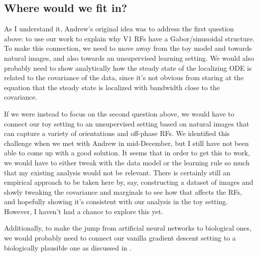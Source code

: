 \subsection*{Where would we fit in?}
As I understand it, Andrew's original idea was to address the first question above: to use our work to explain why V1 RFs have a Gabor/sinusoidal structure.
To make this connection, we need to move away from the toy model and towards natural images, and also towards an unsupervised learning setting.
We would also probably need to show analytically how the steady state of the localizing ODE is related to the covariance of the data, since it's not obvious from staring at the equation that the steady state is localized with bandwidth close to the covariance.

If we were instead to focus on the second question above, we would have to connect our toy setting to an unsupervised setting based on natural images that can capture a variety of orientations and off-phase RFs.
We identified this challenge when we met with Andrew in mid-December, but I still have not been able to come up with a good solution.
It seems that in order to get this to work, we would have to either tweak with the data model or the learning rule so much that my existing analysis would not be relevant.
There is certainly still an empirical approach to be taken here by, say, constructing a dataset of images and slowly tweaking the covariance and marginals to see how that affects the RFs, and hopefully showing it's consistent with our analysis in the toy setting.
However, I haven't had a chance to explore this yet.

Additionally, to make the jump from artificial neural networks to biological ones, we would probably need to connect our vanilla gradient descent setting to a biologically plausible one as discussed in \cite{brito2016nonlinear}.




